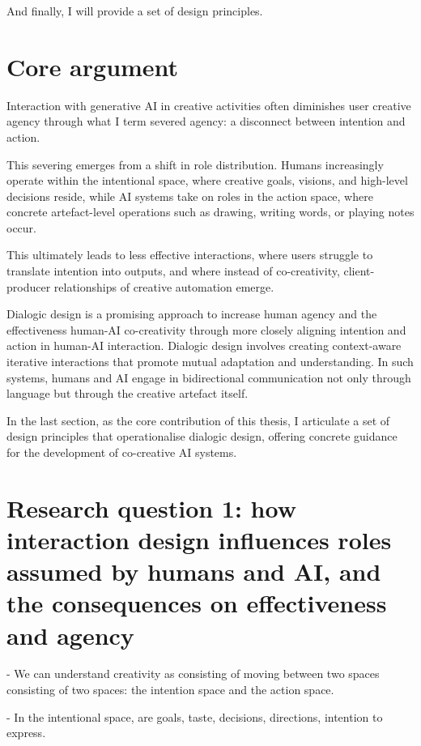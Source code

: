 And finally, I will provide a set of design principles. 

\section{Core argument}


Interaction with generative AI in creative activities often diminishes user creative agency through what I term severed agency: a disconnect between intention and action. 

This severing emerges from a shift in role distribution. Humans increasingly operate within the intentional space, where creative goals, visions, and high-level decisions reside, while AI systems take on roles in the action space, where concrete artefact-level operations such as drawing, writing words, or playing notes occur. 

This ultimately leads to less effective interactions, where users struggle to translate intention into outputs, and where instead of co-creativity, client-producer relationships of creative automation emerge.

Dialogic design is a promising approach to increase human agency and the effectiveness human-AI co-creativity through more closely aligning intention and action in human-AI interaction. Dialogic design involves creating context-aware iterative interactions that promote mutual adaptation and understanding. In such systems, humans and AI engage in bidirectional communication not only through language but through the creative artefact itself. 

In the last section, as the core contribution of this thesis, I articulate a set of design principles that operationalise dialogic design, offering concrete guidance for the development of co-creative AI systems.


\section{Research question 1: how interaction design influences roles assumed by humans and AI, and the consequences on effectiveness and agency}


- We can understand creativity as consisting of moving between two spaces consisting of two spaces: the intention space and the action space.

- In the intentional space, are goals, taste, decisions, directions, intention to express. 

